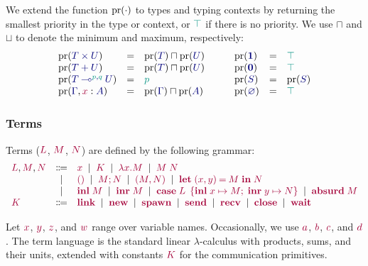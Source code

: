 We extend the function $\operatorname{pr}(\cdot)$ to types and typing contexts by returning the smallest priority in the type or context, or $\cs{\top}$ if there is no priority. We use $\sqcap$ and $\sqcup$ to denote the minimum and maximum, respectively:
\[
  \begin{array}{lcl}
    \minpr(\ty{\typrod{T}{U}})                 & = & \minpr({\ty{T}})\sqcap\minpr({\ty{U}})  \\
    \minpr(\ty{\tysum{T}{U}})                  & = & \minpr({\ty{T}})\sqcap\minpr({\ty{U}})  \\
    \minpr(\ty{\tylolli[\cs{p},\cs{q}]{T}{U}}) & = & \cs{p}                                  \\
    \minpr(\ty{\Gamma}, \tmty{x}{A})           & = & \minpr(\ty{\Gamma})\sqcap\minpr(\ty{A})
  \end{array}
  \qquad
  \begin{array}{lcl}
    \minpr(\ty{\tyunit})   & = & \ptop       \\
    \minpr(\ty{\tyvoid})   & = & \ptop       \\
    \minpr(\ty{S})         & = & \pr(\ty{S}) \\
    \minpr(\ty{\emptyenv}) & = & \ptop
  \end{array}
\]

\subsubsection*{Terms}
Terms ($\tm{L}$, $\tm{M}$, $\tm{N}$) are defined by the following grammar:
\[
  \begin{array}{lcl}
    \tm{L}, \tm{M}, \tm{N}
     & \Coloneqq & \tm{x}
    \sep        \tm{K}
    \sep        \tm{\lambda x.M}
    \sep        \tm{M\;N}                 \\
     & \sep      & \tm{\unit}
    \sep        \tm{\andthen{M}{N}}
    \sep        \tm{\pair{M}{N}}
    \sep        \tm{\letpair{x}{y}{M}{N}} \\
     & \sep      & \tm{\inl{M}}
    \sep        \tm{\inr{M}}
    \sep        \tm{\casesum{L}{x}{M}{y}{N}}
    \sep        \tm{\absurd{M}}           \\
    \tm{K}
     & \Coloneqq & \tm{\link}
    \sep        \tm{\new}
    \sep        \tm{\spawn}
    \sep        \tm{\send}
    \sep        \tm{\recv}
    \sep        \tm{\close}
    \sep        \tm{\wait}
  \end{array}
\]

Let $\tm{x}$, $\tm{y}$, $\tm{z}$, and $\tm{w}$ range over variable names. Occasionally, we use $\tm{a}$, $\tm{b}$, $\tm{c}$, and $\tm{d}$. The term language is the standard linear $\lambda$-calculus with products, sums, and their units, extended with constants $\tm{K}$ for the communication primitives.

